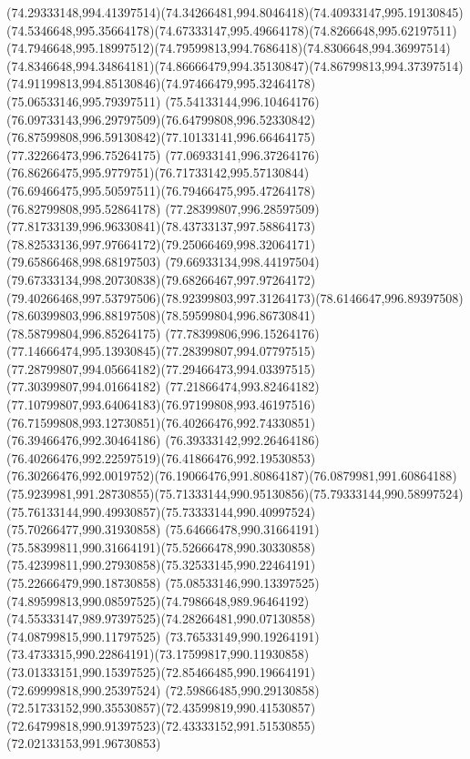 {{  \curveto(74.29333148,994.41397514)(74.34266481,994.8046418)(74.40933147,995.19130845)
  \curveto(74.5346648,995.35664178)(74.67333147,995.49664178)(74.8266648,995.62197511)
  \curveto(74.7946648,995.18997512)(74.79599813,994.7686418)(74.8306648,994.36997514)
  \curveto(74.8346648,994.34864181)(74.86666479,994.35130847)(74.86799813,994.37397514)
  \curveto(74.91199813,994.85130846)(74.97466479,995.32464178)(75.06533146,995.79397511)
  \curveto(75.54133144,996.10464176)(76.09733143,996.29797509)(76.64799808,996.52330842)
  \curveto(76.87599808,996.59130842)(77.10133141,996.66464175)(77.32266473,996.75264175)
  \curveto(77.06933141,996.37264176)(76.86266475,995.9779751)(76.71733142,995.57130844)
  \curveto(76.69466475,995.50597511)(76.79466475,995.47264178)(76.82799808,995.52864178)
  \curveto(77.28399807,996.28597509)(77.81733139,996.96330841)(78.43733137,997.58864173)
  \curveto(78.82533136,997.97664172)(79.25066469,998.32064171)(79.65866468,998.68197503)
  \curveto(79.66933134,998.44197504)(79.67333134,998.20730838)(79.68266467,997.97264172)
  \curveto(79.40266468,997.53797506)(78.92399803,997.31264173)(78.6146647,996.89397508)
  \curveto(78.60399803,996.88197508)(78.59599804,996.86730841)(78.58799804,996.85264175)
  \curveto(77.78399806,996.15264176)(77.14666474,995.13930845)(77.28399807,994.07797515)
  \curveto(77.28799807,994.05664182)(77.29466473,994.03397515)(77.30399807,994.01664182)
  \curveto(77.21866474,993.82464182)(77.10799807,993.64064183)(76.97199808,993.46197516)
  \curveto(76.71599808,993.12730851)(76.40266476,992.74330851)(76.39466476,992.30464186)
  \curveto(76.39333142,992.26464186)(76.40266476,992.22597519)(76.41866476,992.19530853)
  \curveto(76.30266476,992.0019752)(76.19066476,991.80864187)(76.0879981,991.60864188)
  \curveto(75.9239981,991.28730855)(75.71333144,990.95130856)(75.79333144,990.58997524)
  \curveto(75.76133144,990.49930857)(75.73333144,990.40997524)(75.70266477,990.31930858)
  \curveto(75.64666478,990.31664191)(75.58399811,990.31664191)(75.52666478,990.30330858)
  \curveto(75.42399811,990.27930858)(75.32533145,990.22464191)(75.22666479,990.18730858)
  \curveto(75.08533146,990.13397525)(74.89599813,990.08597525)(74.7986648,989.96464192)
  \curveto(74.55333147,989.97397525)(74.28266481,990.07130858)(74.08799815,990.11797525)
  \curveto(73.76533149,990.19264191)(73.4733315,990.22864191)(73.17599817,990.11930858)
  \curveto(73.01333151,990.15397525)(72.85466485,990.19664191)(72.69999818,990.25397524)
  \curveto(72.59866485,990.29130858)(72.51733152,990.35530857)(72.43599819,990.41530857)
  \curveto(72.64799818,990.91397523)(72.43333152,991.51530855)(72.02133153,991.96730853)
}}
